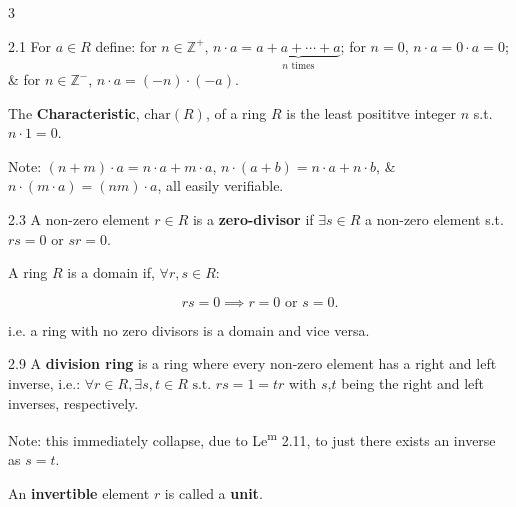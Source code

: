\documentclass[8pt]{extarticle}
\begin{document}
\begin{multicols}{3}
        \begin{definition}{2.1}
            For \(a\in R\) define: for \(n\in\mathbb{Z}^+\), \(n\cdot a=\underbrace{a+a+\cdots+a}_{n\text{ times}}\); for \(n=0\), \(n\cdot a=0\cdot a=0\); \& for \(n\in\mathbb{Z}^-\), \(n\cdot a=(-n)\cdot(-a)\).
            
            The \textbf{Characteristic}, \(\text{char}(R)\), of a ring \(R\) is the least posititve integer \(n\) s.t. \(n\cdot 1=0\).
            
            {\footnotesize Note: \((n+m)\cdot a=n\cdot a+m\cdot a\), \(n\cdot(a+b)=n\cdot a+n\cdot b\), \& \(n\cdot(m\cdot a)=(nm)\cdot a\), all easily verifiable.}
        \end{definition}

        \begin{definition}{2.3}
            A non-zero element \(r\in R\) is a \textbf{zero-divisor} if \(\exists s\in R\) a non-zero element s.t. \(rs=0\) or \(sr=0\).

            A ring \(R\) is a domain if, \(\forall r,s\in R\):

            \vspace{-10pt}
            \[rs=0\implies r=0 \text{ or } s=0.\]
            \vspace{-15pt}

            i.e. a ring with no zero divisors is a domain and vice versa.
        \end{definition}

        \begin{definition}{2.9}
            A \textbf{division ring} is a ring where every non-zero element has a right and left inverse, i.e.: \(\forall r\in R,\exists s,t\in R\text{ s.t. }rs=1=tr\) with \(s\),\(t\) being the right and left inverses, respectively.

            {\footnotesize Note: this immediately collapse, due to Le\textsuperscript{m} 2.11, to just there exists an inverse as \(s=t\).}
            
            An \textbf{invertible} element \(r\) is called a \textbf{unit}.
        \end{definition}

        \newpage

    \end{multicols}
\end{document}
